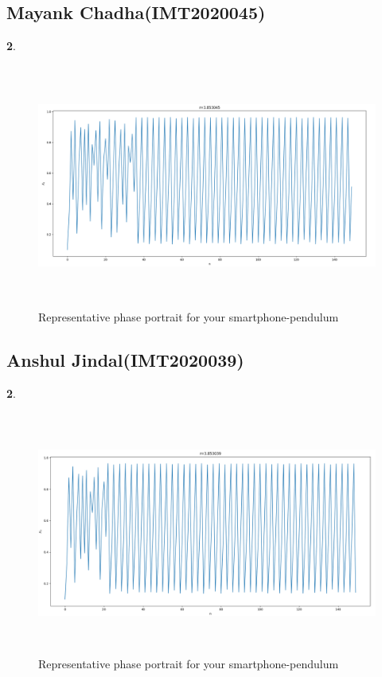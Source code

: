 \documentclass[11pt]{scrartcl} %
\begin{document}
\subsection{Mayank Chadha(IMT2020045)}
\textbf{2}.
\begin{figure}[h] %
	\centering
	\includegraphics[width=12cm, height=8cm]{Mayank.png} %
	\caption {Representative phase portrait for your smartphone-pendulum}
\end{figure}
\subsection{Anshul Jindal(IMT2020039)}
\textbf{2}.
\begin{figure}[h] %
	\centering
	\includegraphics[width=12cm, height=8cm]{anshul_bsdk.png} %
	\caption {Representative phase portrait for your smartphone-pendulum}
\end{figure}
\end{document}
